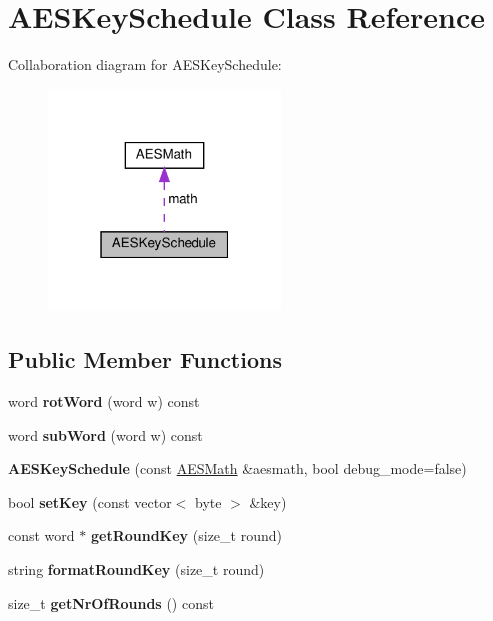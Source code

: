 \hypertarget{classAESKeySchedule}{}\section{A\+E\+S\+Key\+Schedule Class Reference}
\label{classAESKeySchedule}


Collaboration diagram for A\+E\+S\+Key\+Schedule\+:
\nopagebreak
\begin{figure}[H]
\begin{center}
\leavevmode
\includegraphics[width=175pt]{classAESKeySchedule__coll__graph}
\end{center}
\end{figure}
\subsection*{Public Member Functions}
\begin{DoxyCompactItemize}
\item 
\mbox{\label{classAESKeySchedule_a8f2b4c390d4e2c15d9c40d913ca13569}} 
word {\bfseries rot\+Word} (word w) const
\item 
\mbox{\label{classAESKeySchedule_a2c36c243dfca9d1e14b2f51a54a7ba08}} 
word {\bfseries sub\+Word} (word w) const
\item 
\mbox{\label{classAESKeySchedule_a2707159d48ec5b8efcd03c35fbd3d1f4}} 
{\bfseries A\+E\+S\+Key\+Schedule} (const \hyperlink{classAESMath}{A\+E\+S\+Math} \&aesmath, bool debug\+\_\+mode=false)
\item 
\mbox{\label{classAESKeySchedule_a135e4dc17597a3c6f9f023a5a634841c}} 
bool {\bfseries set\+Key} (const vector$<$ byte $>$ \&key)
\item 
\mbox{\label{classAESKeySchedule_af62dc82a6838d3fcb4f9c520acadbc77}} 
const word $\ast$ {\bfseries get\+Round\+Key} (size\+\_\+t round)
\item 
\mbox{\label{classAESKeySchedule_a8ffabf92c36f2ea32a38b339a2595ba6}} 
string {\bfseries format\+Round\+Key} (size\+\_\+t round)
\item 
\mbox{\label{classAESKeySchedule_ac02d449e82f1d8a5410b3e7b51f85cd9}} 
size\+\_\+t {\bfseries get\+Nr\+Of\+Rounds} () const
\end{DoxyCompactItemize}
